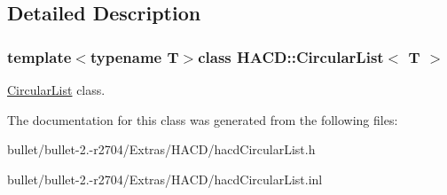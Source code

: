 \subsection{Detailed Description}
\subsubsection*{template$<$typename T$>$class H\+A\+C\+D\+::\+Circular\+List$<$ T $>$}

\hyperlink{class_h_a_c_d_1_1_circular_list}{Circular\+List} class. 

The documentation for this class was generated from the following files\+:\begin{DoxyCompactItemize}
\item 
bullet/bullet-\/2.-\/r2704/\+Extras/\+H\+A\+C\+D/hacd\+Circular\+List.\+h\item 
bullet/bullet-\/2.-\/r2704/\+Extras/\+H\+A\+C\+D/hacd\+Circular\+List.\+inl\end{DoxyCompactItemize}
